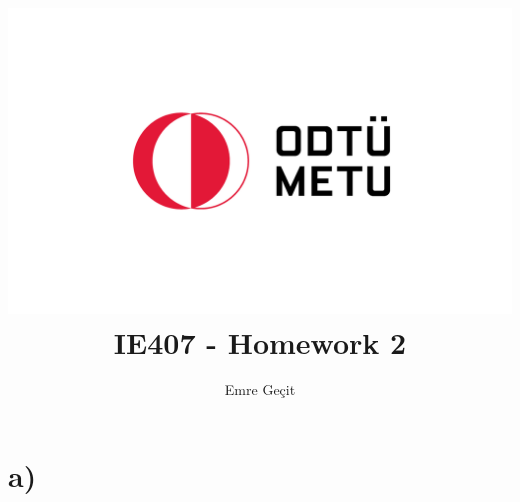 \documentclass{article}
\author{Emre Geçit}
\title{\includegraphics{9.4.png}\\ IE407 - Homework 2}
\begin{document}
\maketitle

\newpage

\section*{a)}
\end{document}
